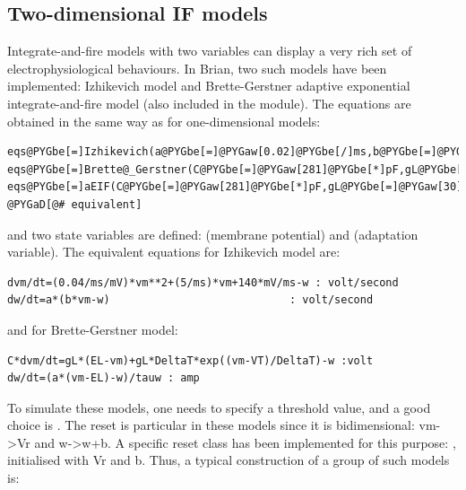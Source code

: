 \documentclass[letterpaper,10pt,english]{manual}
\begin{document}
\subsection{Two-dimensional IF models}

Integrate-and-fire models with two variables can display a very rich set of electrophysiological behaviours.
In Brian, two such models have been implemented: Izhikevich model and Brette-Gerstner adaptive exponential
integrate-and-fire model (also included in the  module).
The equations are obtained in the same way as for one-dimensional models:

\begin{Verbatim}[commandchars=@\[\]]
eqs@PYGbe[=]Izhikevich(a@PYGbe[=]@PYGaw[0.02]@PYGbe[/]ms,b@PYGbe[=]@PYGaw[0.2]@PYGbe[/]ms)
eqs@PYGbe[=]Brette@_Gerstner(C@PYGbe[=]@PYGaw[281]@PYGbe[*]pF,gL@PYGbe[=]@PYGaw[30]@PYGbe[*]nS,EL@PYGbe[=]@PYGbe[-]@PYGaw[70.6]@PYGbe[*]mV,VT@PYGbe[=]@PYGbe[-]@PYGaw[50.4]@PYGbe[*]mV,DeltaT@PYGbe[=]@PYGaw[2]@PYGbe[*]mV,tauw@PYGbe[=]@PYGaw[144]@PYGbe[*]ms,a@PYGbe[=]@PYGaw[4]@PYGbe[*]nS)
eqs@PYGbe[=]aEIF(C@PYGbe[=]@PYGaw[281]@PYGbe[*]pF,gL@PYGbe[=]@PYGaw[30]@PYGbe[*]nS,EL@PYGbe[=]@PYGbe[-]@PYGaw[70.6]@PYGbe[*]mV,VT@PYGbe[=]@PYGbe[-]@PYGaw[50.4]@PYGbe[*]mV,DeltaT@PYGbe[=]@PYGaw[2]@PYGbe[*]mV,tauw@PYGbe[=]@PYGaw[144]@PYGbe[*]ms,a@PYGbe[=]@PYGaw[4]@PYGbe[*]nS) @PYGaD[@# equivalent]
\end{Verbatim}

and two state variables are defined:  (membrane potential) and  (adaptation variable).
The equivalent equations for Izhikevich model are:

\begin{Verbatim}[commandchars=@\[\]]
dvm/dt=(0.04/ms/mV)*vm**2+(5/ms)*vm+140*mV/ms-w : volt/second
dw/dt=a*(b*vm-w)                            : volt/second
\end{Verbatim}

and for Brette-Gerstner model:

\begin{Verbatim}[commandchars=@\[\]]
C*dvm/dt=gL*(EL-vm)+gL*DeltaT*exp((vm-VT)/DeltaT)-w :volt
dw/dt=(a*(vm-EL)-w)/tauw : amp
\end{Verbatim}

To simulate these models, one needs to specify a threshold value, and a good choice is
. The reset is particular in these models since it is bidimensional:
vm-\textgreater{}Vr and w-\textgreater{}w+b. A specific reset class has been implemented for this purpose:
, initialised with Vr and b. Thus, a typical construction of a group of
such models is:
\end{document}

